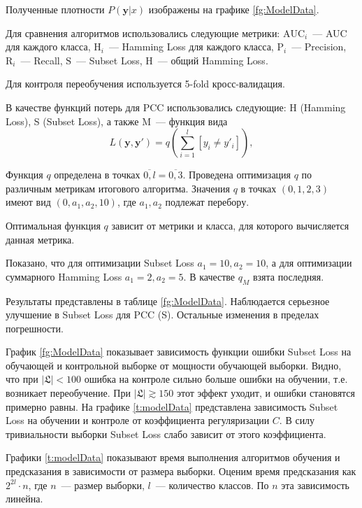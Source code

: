 \documentclass{ITaSconf}
\newcommand{\y}{\mathbf{y}}
\begin{document}

Полученные плотности $P(\y|x)$ изображены на графике \ref{fg:ModelData}.

Для сравнения алгоритмов использовались следующие метрики: $\mbox{AUC}_i$~--- AUC для каждого класса, $\mbox{H}_i$~--- Hamming Loss для каждого класса, $\mbox{P}_i$~--- Precision, $\mbox{R}_i$~--- Recall, $\mbox{S}$~--- Subset Loss, $\mbox{H}$~--- общий Hamming Loss.

Для контроля переобучения используется 5-fold кросс-валидация.

В качестве функций потерь для PCC использовались следующие: H (Hamming Loss), S (Subset Loss), а также M~--- функция вида
$$L(\y,\y')=q\left(\sum\limits_{i=1}^l[y_i\neq y'_i]\right),$$

Функция $q$ определена в точках $\overline{0,l}=\overline{0,3}$. Проведена оптимизация $q$ по различным метрикам итогового алгоритма. Значения $q$ в точках $(0,1,2,3)$ имеют вид $(0,a_1,a_2,10)$, где $a_1,a_2$ подлежат перебору.

Оптимальная функция $q$ зависит от метрики и класса, для которого вычисляется данная метрика.

Показано, что для оптимизации Subset Loss $a_1=10,a_2=10$, а для оптимизации суммарного Hamming Loss $a_1=2, a_2=5$. В качестве $q_M$ взята последняя.

Результаты представлены в таблице \ref{fg:ModelData}. Наблюдается серьезное улучшение в Subset Loss для PCC (S). Остальные изменения в пределах погрешности.

График \ref{fg:ModelData} показывает зависимость функции ошибки Subset Loss на обучающей и контрольной выборке от мощности обучающей выборки. Видно, что при $|\mathfrak{L}|<100$ ошибка на контроле сильно больше ошибки на обучении, т.е. возникает переобучение. При $|\mathfrak{L}|\gtrsim 150$ этот эффект уходит, и ошибки становятся примерно равны. На графике \ref{t:modelData} представлена зависимость Subset Loss на обучении и контроле от коэффициента регуляризации $C$. В силу тривиальности выборки Subset Loss слабо зависит от этого коэффициента.

Графики \ref{t:modelData} показывают время выполнения алгоритмов обучения и предсказания в зависимости от размера выборки. Оценим время предсказания как $2^{2l}\cdot n$, где $n$~--- размер выборки, $l$~--- количество классов. По $n$ эта зависимость линейна.
\end{document}
